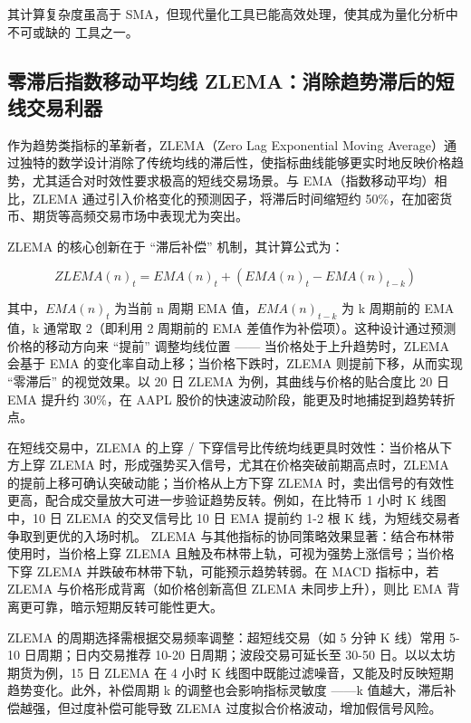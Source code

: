 \documentclass[]{ctexbook}
\begin{document}
其计算复杂度虽高于 SMA，但现代量化工具已能高效处理，使其成为量化分析中不可或缺的
工具之一。

\subsection{零滞后指数移动平均线 ZLEMA：消除趋势滞后的短线交易利器}\label{ux96f6ux6edeux540eux6307ux6570ux79fbux52a8ux5e73ux5747ux7ebf-zlemaux6d88ux9664ux8d8bux52bfux6edeux540eux7684ux77edux7ebfux4ea4ux6613ux5229ux5668}

作为趋势类指标的革新者，ZLEMA（Zero Lag Exponential Moving Average）通过独特的数学设计消除了传统均线的滞后性，使指标曲线能够更实时地反映价格趋势，尤其适合对时效性要求极高的短线交易场景。与 EMA（指数移动平均）相比，ZLEMA 通过引入价格变化的预测因子，将滞后时间缩短约 50\%，在加密货币、期货等高频交易市场中表现尤为突出。

ZLEMA 的核心创新在于 ``滞后补偿'' 机制，其计算公式为：

\[ZLEMA(n)_t = EMA(n)_t + (EMA(n)_t - EMA(n)_{t-k})\]

其中，\(EMA(n)_t\) 为当前 n 周期 EMA 值，\(EMA(n)_{t-k}\) 为 k 周期前的 EMA 值，k 通常取 2（即利用 2 周期前的 EMA 差值作为补偿项）。这种设计通过预测价格的移动方向来 ``提前'' 调整均线位置 ------ 当价格处于上升趋势时，ZLEMA 会基于 EMA 的变化率自动上移；当价格下跌时，ZLEMA 则提前下移，从而实现 ``零滞后'' 的视觉效果。以 20 日 ZLEMA 为例，其曲线与价格的贴合度比 20 日 EMA 提升约 30\%，在 AAPL 股价的快速波动阶段，能更及时地捕捉到趋势转折点。

在短线交易中，ZLEMA 的上穿 / 下穿信号比传统均线更具时效性：当价格从下方上穿 ZLEMA 时，形成强势买入信号，尤其在价格突破前期高点时，ZLEMA 的提前上移可确认突破动能；当价格从上方下穿 ZLEMA 时，卖出信号的有效性更高，配合成交量放大可进一步验证趋势反转。例如，在比特币 1 小时 K 线图中，10 日 ZLEMA 的交叉信号比 10 日 EMA 提前约 1-2 根 K 线，为短线交易者争取到更优的入场时机。
ZLEMA 与其他指标的协同策略效果显著：结合布林带使用时，当价格上穿 ZLEMA 且触及布林带上轨，可视为强势上涨信号；当价格下穿 ZLEMA 并跌破布林带下轨，可能预示趋势转弱。在 MACD 指标中，若 ZLEMA 与价格形成背离（如价格创新高但 ZLEMA 未同步上升），则比 EMA 背离更可靠，暗示短期反转可能性更大。

ZLEMA 的周期选择需根据交易频率调整：超短线交易（如 5 分钟 K 线）常用 5-10 日周期；日内交易推荐 10-20 日周期；波段交易可延长至 30-50 日。以以太坊期货为例，15 日 ZLEMA 在 4 小时 K 线图中既能过滤噪音，又能及时反映短期趋势变化。此外，补偿周期 k 的调整也会影响指标灵敏度 ------k 值越大，滞后补偿越强，但过度补偿可能导致 ZLEMA 过度拟合价格波动，增加假信号风险。
\end{document}
